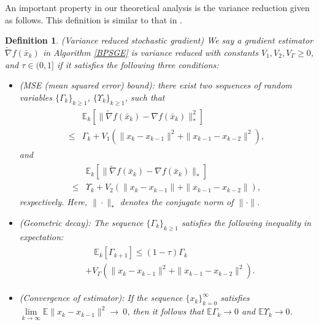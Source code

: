 \documentclass[letterpaper]{article} %
\newtheorem{definition}{Definition}
\begin{document}
	An important property in our theoretical analysis is  the variance reduction  given as follows.  
	This definition is similar to that in  \cite{ DriggsTLDS2020, WangH23}.  
	\begin{definition}\label{vr_definition} (Variance reduced stochastic gradient) 
		We say a gradient estimator  $\tilde{\nabla}f(\bar{x}_{k})$ in Algorithm \ref{BPSGE} is variance reduced with constants $V_{1}, V_{2},V_{\Gamma}\ge 0$, and $\tau\in(0,1]$ if it satisfies the following three conditions:
		\begin{itemize}
			\item (MSE (mean squared error) bound): there exist two sequences of random variables $\{\Gamma_{k}\}_{k\ge1}$,  $\{\Upsilon_{k}\}_{k\ge1}$,  such that
			\begin{eqnarray}
				\begin{aligned}
					&\mathbb{E}_{k}[\|\tilde{\nabla}f(\bar{x}_{k})-\nabla f(\bar{x}_{k})\|_{*}^{2}]\\
					\le& \Gamma_{k}+ V_{1}\left(\|x_{k}-x_{k-1}\|^{2}+\|x_{k-1}-x_{k-2}\|^{2}\right),
				\end{aligned}\label{MSE_l22}
			\end{eqnarray}
			and 
			\begin{eqnarray}
				\begin{aligned}
					&\mathbb{E}_{k}[\|\tilde{\nabla}f(\bar{x}_{k})-\nabla f(\bar{x}_{k})\|_{*}]\\
					\le&\Upsilon_{k}+ V_{2}\left(\|x_{k}-x_{k-1}\|+\|x_{k-1}-x_{k-2}\|\right),
				\end{aligned}\label{MSE_l2}
			\end{eqnarray}
			respectively. Here, $\|\cdot\|_{*}$ denotes the conjugate norm \cite{Rockafellar1970} of $\|\cdot\|$.
			\item (Geometric decay): 
			The sequence $\{\Gamma_{k}\}_{k\ge1}$ satisfies the following inequality in expectation:
			\begin{eqnarray}
				\begin{aligned}
					&\quad \mathbb{E}_{k}[\Gamma_{k+1}]\le (1-\tau)\Gamma_{k}\\&+V_{\Gamma}\left(\|x_{k}-x_{k-1}\|^{2}+\|x_{k-1}-x_{k-2}\|^{2}\right).\label{Gamma_k1_k}
				\end{aligned}
			\end{eqnarray}
			\item (Convergence of estimator): 
			If the sequence  $\{x_{k}\}_{k=0}^{\infty}$ satisfies $\lim\limits_{k\rightarrow\infty}\mathbb{E}\|x_{k}-x_{k-1}\|^{2}\rightarrow~0$, then it follows that $\mathbb{E}\Gamma_{k}\rightarrow0$ and $\mathbb{E}\Upsilon_{k}\rightarrow0$.
		\end{itemize}
	\end{definition}
	
\end{document}
